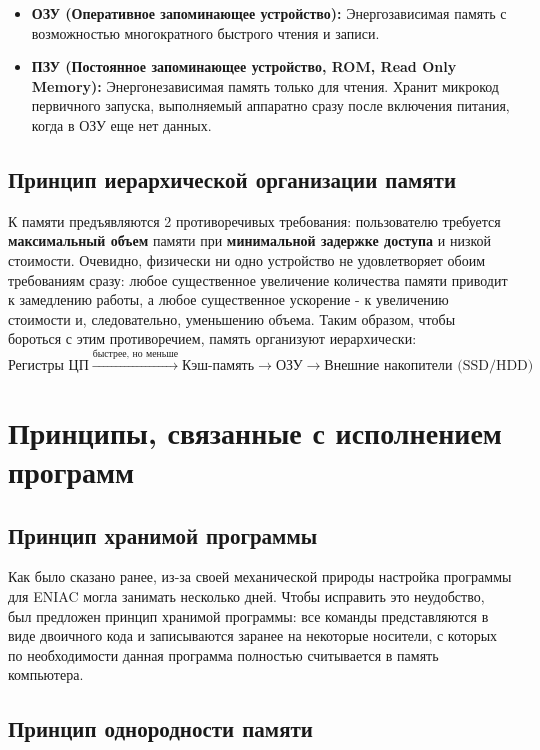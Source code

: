 \documentclass[11pt,a4paper]{article}
\begin{document}
\begin{itemize}
    \item \textbf{ОЗУ (Оперативное запоминающее устройство):} Энергозависимая память с возможностью многократного быстрого чтения и записи.
    \item \textbf{ПЗУ (Постоянное запоминающее устройство, ROM, Read Only Memory):} Энергонезависимая память только для чтения. Хранит микрокод первичного запуска, выполняемый аппаратно сразу после включения питания, когда в ОЗУ еще нет данных.
\end{itemize}

\subsection{Принцип иерархической организации памяти}
К памяти предъявляются 2 противоречивых требования: пользователю требуется \textbf{максимальный объем} памяти при \textbf{минимальной задержке доступа} и низкой стоимости. Очевидно, физически ни одно устройство не удовлетворяет обоим требованиям сразу: любое существенное увеличение количества памяти приводит к замедлению работы, а любое существенное ускорение - к увеличению стоимости и, следовательно, уменьшению объема. Таким образом, чтобы бороться с этим противоречием, память организуют иерархически:
$$\text{Регистры ЦП} \xrightarrow{\text{быстрее, но меньше}} \text{Кэш-память} \to \text{ОЗУ} \to \text{Внешние накопители (SSD/HDD)}$$

\section{Принципы, связанные с исполнением программ}

\subsection{Принцип хранимой программы}

Как было сказано ранее, из-за своей механической природы настройка программы для ENIAC могла занимать несколько дней. Чтобы исправить это неудобство, был предложен принцип хранимой программы: все команды представляются в виде двоичного кода и записываются заранее на некоторые носители, с которых по необходимости данная программа полностью считывается в память компьютера.

\subsection{Принцип однородности памяти}
\end{document}
